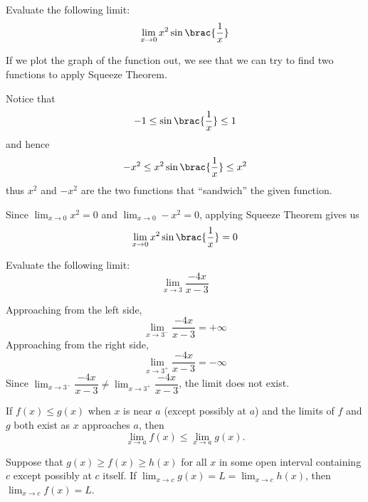 \begin{exercise}{}{}
Evaluate the following limit:
\[ \lim_{x\to 0} x^2\sin\brac{\frac{1}{x}} \]
\end{exercise}

\begin{solution}
If we plot the graph of the function out, we see that we can try to find two functions to apply Squeeze Theorem.

Notice that \[ -1 \le \sin\brac{\frac{1}{x}} \le 1 \]
and hence
\[ -x^2 \le x^2\sin\brac{\frac{1}{x}} \le x^2 \]
thus $x^2$ and $-x^2$ are the two functions that ``sandwich'' the given function.

Since $\lim_{x\to 0}x^2=0$ and $\lim_{x\to 0}-x^2=0$, applying Squeeze Theorem gives us 
\[ \lim_{x\to 0} x^2\sin\brac{\frac{1}{x}} = 0 \]
\end{solution}

\begin{exercise}{}{}
Evaluate the following limit:
\[ \lim_{x\to 3}\frac{-4x}{x-3} \]
\end{exercise}

\begin{solution}
Approaching from the left side,
\[ \lim_{x\to 3^-}\frac{-4x}{x-3} = +\infty \]
Approaching from the right side,
\[ \lim_{x\to 3^+}\frac{-4x}{x-3} = -\infty \]
Since $\lim_{x\to 3^-}\dfrac{-4x}{x-3} \neq \lim_{x\to 3^+}\dfrac{-4x}{x-3}$, the limit does not exist.
\end{solution}

\begin{theorem}
If $f(x) \le g(x)$ when $x$ is near $a$ (except possibly at $a$) and the limits of $f$ and $g$ both exist as $x$ approaches $a$, then
\[ \lim_{x\to a}f(x) \le \lim_{x\to a}g(x). \]
\end{theorem}

\begin{theorem}
Suppose that $g(x) \ge f(x) \ge h(x)$ for all $x$ in some open interval containing $c$ except possibly at $c$ itself. If $\lim_{x\to c} g(x) = L = \lim_{x\to c} h(x)$, then $\lim_{x\to c} f(x) = L$.
\end{theorem}

